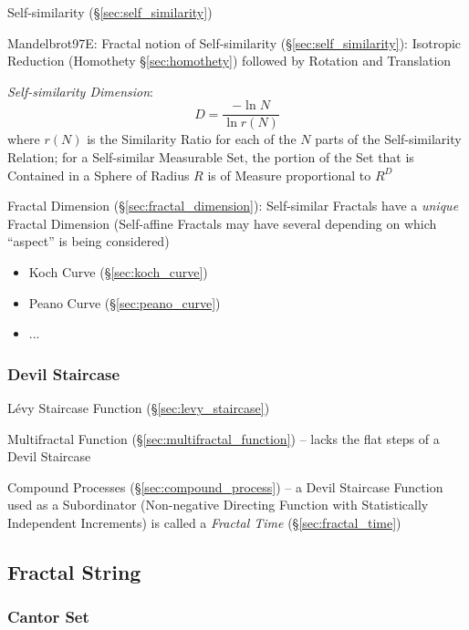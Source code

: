Self-similarity (\S\ref{sec:self_similarity})

Mandelbrot97E: Fractal notion of Self-similarity (\S\ref{sec:self_similarity}):
Isotropic Reduction (Homothety \S\ref{sec:homothety}) followed by Rotation and
Translation

\emph{Self-similarity Dimension}:
\[
  D = \frac{-\ln N}{\ln r(N)}
\]
where $r(N)$ is the Similarity Ratio for each of the $N$ parts of the
Self-similarity Relation; for a Self-similar Measurable Set, the portion of the
Set that is Contained in a Sphere of Radius $R$ is of Measure proportional to
$R^D$

Fractal Dimension (\S\ref{sec:fractal_dimension}): Self-similar Fractals have a
\emph{unique} Fractal Dimension (Self-affine Fractals may have several depending
on which ``aspect'' is being considered)

\begin{itemize}
  \item Koch Curve (\S\ref{sec:koch_curve})
  \item Peano Curve (\S\ref{sec:peano_curve})
  \item ...
\end{itemize}



\subsubsection{Devil Staircase}\label{sec:devil_staircase}

L\'evy Staircase Function (\S\ref{sec:levy_staircase})

\fist Multifractal Function (\S\ref{sec:multifractal_function}) -- lacks the
flat steps of a Devil Staircase

Compound Processes (\S\ref{sec:compound_process}) -- a Devil Staircase Function
used as a Subordinator (Non-negative Directing Function with Statistically
Independent Increments) is called a \emph{Fractal Time}
(\S\ref{sec:fractal_time})



\subsection{Fractal String}\label{sec:fractal_string}

\subsubsection{Cantor Set}\label{sec:cantor_set}

